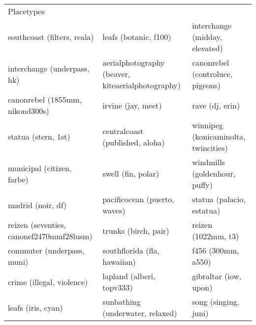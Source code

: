 \begin{table}[]
\begin{tabular}{lll}
		Placetypes                               &                                                   &                                                          \\
		southcoast (filters, reala)              & leafs (botanic, f100)                             & interchange (midday, elevated)                           \\
		interchange (underpass, hk)              & aerialphotography (beaver, kiteaerialphotography) & canonrebel (controluce, pigeons)                         \\
		canonrebel (1855mm, nikond300s)          & irvine (jay, meet)                                & rave (dj, erin)                                          \\
		statua (stern, 1st)                      & centralcoast (published, aloha)                   & winnipeg (konicaminolta, twincities)                     \\
		municipal (citizen, farbe)               & swell (fin, polar)                                & windmills (goldenhour, puffy)                            \\
		madrid (noir, df)                        & pacificocean (puerto, waves)                      & statua (palacio, estatua)                                \\
		reizen (seventies, canonef2470mmf28lusm) & trunks (birch, pair)                              & reizen (1022mm, t3)                                      \\
		commuter (underpass, muni)               & southflorida (fla, hawaiian)                      & f456 (300mm, a550)                                       \\
		crime (illegal, violence)                & lapland (alberi, topv333)                         & gibraltar (iow, upon)                                    \\
		leafs (iris, cyan)                       & sunbathing (underwater, relaxed)                  & song (singing, juni)                                     \\


\end{tabular}
\end{table}
